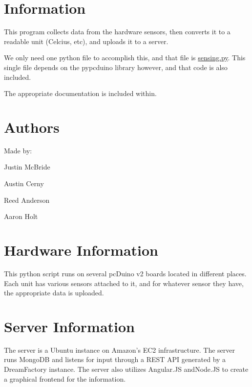 \hypertarget{index_information}{}\section{Information}\label{index_information}
This program collects data from the hardware sensors, then converts it to a readable unit (Celcius, etc), and uploads it to a server.

We only need one python file to accomplish this, and that file is \hyperlink{sensing_8py}{sensing.\-py}. This single file depends on the pypcduino library however, and that code is also included.

The appropriate documentation is included within.\hypertarget{index_authors}{}\section{Authors}\label{index_authors}
Made by\-:
\begin{DoxyItemize}
\item Justin Mc\-Bride
\item Austin Cerny
\item Reed Anderson
\item Aaron Holt
\end{DoxyItemize}\hypertarget{index_hardwareinfo}{}\section{Hardware Information}\label{index_hardwareinfo}
This python script runs on several pc\-Duino v2 boards located in different places. Each unit has various sensors attached to it, and for whatever sensor they have, the appropriate data is uploaded.\hypertarget{index_serverinfo}{}\section{Server Information}\label{index_serverinfo}
The server is a Ubuntu instance on Amazon's E\-C2 infrastructure. The server runs Mongo\-D\-B and listens for input through a R\-E\-S\-T A\-P\-I generated by a Dream\-Factory instance. The server also utilizes Angular.\-J\-S and\-Node.\-J\-S to create a graphical frontend for the information. 